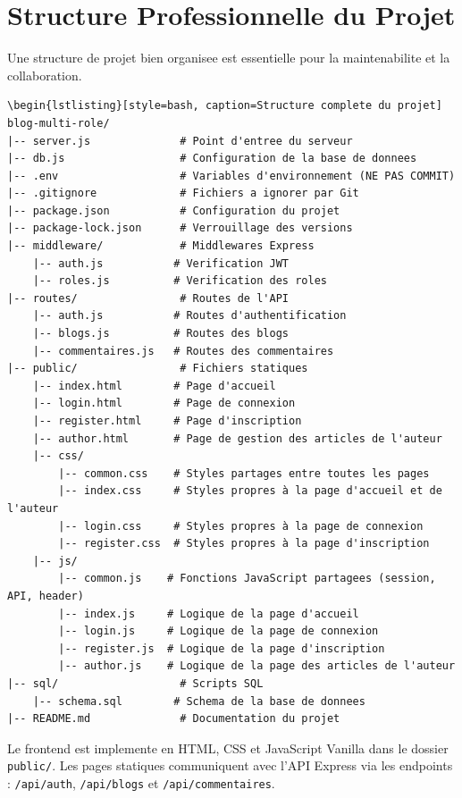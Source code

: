 \documentclass[a4paper,12pt]{book}
\begin{document}
\section{Structure Professionnelle du Projet}

Une structure de projet bien organisee est essentielle pour la maintenabilite et la collaboration.

\begin{lstlisting}[style=bash, caption=Structure complete du projet]
\begin{lstlisting}[style=bash, caption=Structure complete du projet]
blog-multi-role/
|-- server.js              # Point d'entree du serveur
|-- db.js                  # Configuration de la base de donnees
|-- .env                   # Variables d'environnement (NE PAS COMMIT)
|-- .gitignore             # Fichiers a ignorer par Git
|-- package.json           # Configuration du projet
|-- package-lock.json      # Verrouillage des versions
|-- middleware/            # Middlewares Express
    |-- auth.js           # Verification JWT
    |-- roles.js          # Verification des roles
|-- routes/                # Routes de l'API
    |-- auth.js           # Routes d'authentification
    |-- blogs.js          # Routes des blogs
    |-- commentaires.js   # Routes des commentaires
|-- public/                # Fichiers statiques
    |-- index.html        # Page d'accueil
    |-- login.html        # Page de connexion
    |-- register.html     # Page d'inscription
    |-- author.html       # Page de gestion des articles de l'auteur
    |-- css/
        |-- common.css    # Styles partages entre toutes les pages
        |-- index.css     # Styles propres à la page d'accueil et de l'auteur
        |-- login.css     # Styles propres à la page de connexion
        |-- register.css  # Styles propres à la page d'inscription
    |-- js/
        |-- common.js    # Fonctions JavaScript partagees (session, API, header)
        |-- index.js     # Logique de la page d'accueil
        |-- login.js     # Logique de la page de connexion
        |-- register.js  # Logique de la page d'inscription
        |-- author.js    # Logique de la page des articles de l'auteur
|-- sql/                   # Scripts SQL
    |-- schema.sql        # Schema de la base de donnees
|-- README.md              # Documentation du projet
\end{lstlisting}

Le frontend est implemente en HTML, CSS et JavaScript Vanilla dans le dossier \texttt{public/}. Les pages statiques communiquent avec l'API Express via les endpoints :
\texttt{/api/auth}, \texttt{/api/blogs} et \texttt{/api/commentaires}.
\end{document}
